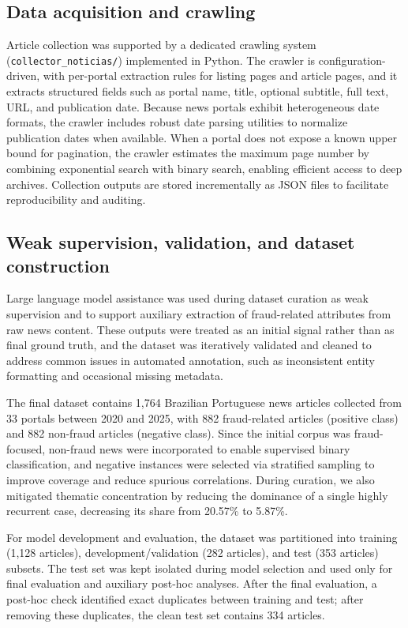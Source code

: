 \documentclass[conference]{IEEEtran}
\begin{document}
\subsection{Data acquisition and crawling}

Article collection was supported by a dedicated crawling system (\texttt{collector\_noticias/}) implemented in Python. The crawler is configuration-driven, with per-portal extraction rules for listing pages and article pages, and it extracts structured fields such as portal name, title, optional subtitle, full text, URL, and publication date. Because news portals exhibit heterogeneous date formats, the crawler includes robust date parsing utilities to normalize publication dates when available. When a portal does not expose a known upper bound for pagination, the crawler estimates the maximum page number by combining exponential search with binary search, enabling efficient access to deep archives. Collection outputs are stored incrementally as JSON files to facilitate reproducibility and auditing.

\subsection{Weak supervision, validation, and dataset construction}

Large language model assistance was used during dataset curation as weak supervision and to support auxiliary extraction of fraud-related attributes from raw news content. These outputs were treated as an initial signal rather than as final ground truth, and the dataset was iteratively validated and cleaned to address common issues in automated annotation, such as inconsistent entity formatting and occasional missing metadata.

The final dataset contains 1,764 Brazilian Portuguese news articles collected from 33 portals between 2020 and 2025, with 882 fraud-related articles (positive class) and 882 non-fraud articles (negative class). Since the initial corpus was fraud-focused, non-fraud news were incorporated to enable supervised binary classification, and negative instances were selected via stratified sampling to improve coverage and reduce spurious correlations. During curation, we also mitigated thematic concentration by reducing the dominance of a single highly recurrent case, decreasing its share from 20.57\% to 5.87\%.

For model development and evaluation, the dataset was partitioned into training (1,128 articles), development/validation (282 articles), and test (353 articles) subsets. The test set was kept isolated during model selection and used only for final evaluation and auxiliary post-hoc analyses. After the final evaluation, a post-hoc check identified exact duplicates between training and test; after removing these duplicates, the clean test set contains 334 articles.
\end{document}
